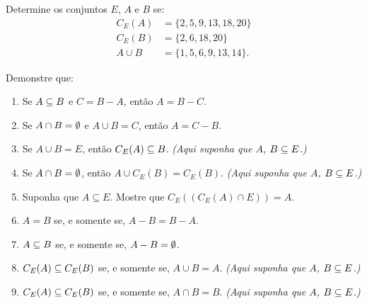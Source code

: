 \documentclass[12pt]{exam}
\begin{document}
    \vspace{.3cm}

    \questao{} Determine os conjuntos $E$, $A$ e $B$ se:
    \begin{align*}
        C_E(A) &= \{2, 5, 9, 13, 18, 20\}\\
        C_E(B) &= \{2, 6, 18, 20\}\\
        A \cup B &= \{1, 5, 6, 9, 13, 14\}.
    \end{align*}

    \newpage

    \questao{} Demonstre que:
    \begin{enumerate}[label={\alph*})]

        \item Se $A \subseteq B$ e $C = B - A$, então $A = B - C$.

        \item Se $A \cap B = \emptyset$ e $A \cup B = C$, então $A = C - B$.

        \item Se $A\cup B = E$, então $C_E(A) \subseteq B$. \textit{(Aqui suponha que $A$,            $B \subseteq E$.)}

        \item Se $A \cap B = \emptyset$, então $A \cup C_E(B) = C_E(B)$. \textit{(Aqui suponha que $A$, $B \subseteq E$.)}

        \item Suponha que $A \subseteq E$. Mostre que $C_E((C_E(A) \cap E)) = A$.

        \item $A = B$ se, e somente se, $A - B = B - A$.

        \item $A \subseteq B$ se, e somente se, $A - B = \emptyset$.

        \item $C_E(A) \subseteq C_E(B)$ se, e somente se, $A \cup B = A$. \textit{(Aqui suponha que $A$, $B \subseteq E$.)}

        \item $C_E(A) \subseteq C_E(B)$ se, e somente se, $A \cap B = B$. \textit{(Aqui suponha que $A$, $B \subseteq E$.)}

    \end{enumerate}

    \vspace{.3cm}
\end{document}
